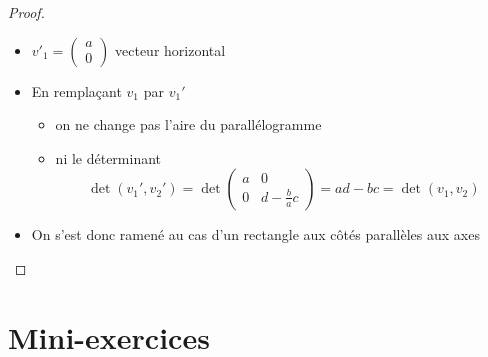 \begin{frame}
\begin{proof}

\begin{itemize}
  \item $v'_1= \left(\begin{smallmatrix}a\\0\end{smallmatrix}\right)$ vecteur horizontal
  
  \item \pause En remplaçant $v_1$ par $v_1'$ 
\begin{itemize}   
  \item \pause on ne change pas l'aire du parallélogramme
\vspace*{-1ex}
  \item \pause ni le déterminant $$\det(v_1',v_2')=
\det \begin{pmatrix}
a&0\\
0&d-\frac{b}{a}c
\end{pmatrix}
=ad-bc=\det(v_1,v_2)$$
\end{itemize}
  \item \pause On s'est donc ramené au  cas d'un rectangle aux côtés parallèles aux axes \qedhere
\end{itemize}
\vspace*{-2ex}
\end{proof}
\end{frame}



\section{Mini-exercices}

